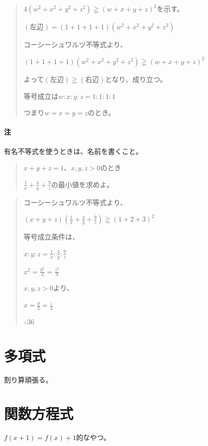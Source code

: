 \documentclass[uplatex,fleqn]{jsbook}
\begin{document}
\begin{quote}
    $4\left(w^2+x^2+y^2+z^2\right)\geqq \left(w+x+y+z\right)^2$を示す。

    $\left(\text{左辺}\right)=\left(1+1+1+1\right)\left(w^2+x^2+y^2+z^2\right)$

    コーシーシュワルツ不等式より、

    $\left(1+1+1+1\right)\left(w^2+x^2+y^2+z^2\right)\geqq \left(w+x+y+z\right)^2$

    よって$\left(\text{左辺}\right)\geqq \left(右辺\right)$となり、成り立つ。

    等号成立は$w:x:y:z=1:1:1:1$

    つまり$w=x=y=z$のとき。
\end{quote}

\paragraph{注}有名不等式を使うときは、名前を書くこと。

\begin{quote}
    $x+y+z=1$、$x,y,z>0$のとき

    $\displaystyle \frac{1}{x}+\frac{4}{y}+\frac{9}{z}$の最小値を求めよ。
\end{quote}

\begin{quote}
    コーシーシュワルツ不等式より、

    $\displaystyle \left(x+y+z\right)\left(\frac{1}{x}+\frac{4}{y}+\frac{9}{z}\right)\geqq \left(1+2+3\right)^2$

    等号成立条件は、

    $\displaystyle x:y:z=\frac{1}{x}:\frac{4}{y}:\frac{9}{z}$

    $x^2=\frac{y^2}{4}=\frac{z^2}{9}$

    $x,y,z>0$より、

    $x=\frac{y}{2}=\frac{z}{3}$

    $\therefore 36$
\end{quote}

\section{多項式}
割り算頑張る。

\section{関数方程式}
$f\left(x+1\right)=f\left(x\right)+1$的なやつ。
\end{document}
